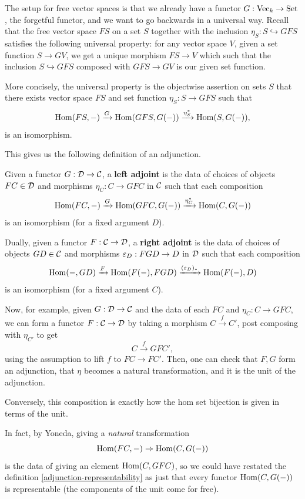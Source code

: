 \documentclass[12pt]{article}
\begin{document}
The setup for free vector spaces is that we already have a functor $G: \mathrm{Vec}_k \to \mathrm{Set}$, the forgetful functor, and we want to go backwards in a universal way. Recall that the free vector space $FS$ on a set $S$ together with the inclusion $\eta_S: S\hookrightarrow GFS$ satisfies the following universal property: for any vector space $V$, given a set function $S\to GV$, we get a unique morphism $FS\to V$ which such that the inclusion $S\hookrightarrow GFS$ composed with $GFS\to GV$ is our given set function.

More concisely, the universal property is the objectwise assertion on sets $S$ that there exists vector space $FS$ and set function $\eta_S: S\to GFS$ such that
\[\mathrm{Hom}(FS,-) \xrightarrow{G} \mathrm{Hom}(GFS,G(-)) \xrightarrow{\eta_S^*} \mathrm{Hom}(S,G(-)),\]
is an isomorphism.

This gives us the following definition of an adjunction.

\begin{defn} \label{adjunction-representability}
    Given a functor $G: \mathcal{D}\to \mathcal{C}$, a \textbf{left adjoint} is the data of choices of objects $FC \in \mathcal{D}$ and morphisms $\eta_C: C \to GFC$ in $\mathcal{C}$ such that each composition
    \[\mathrm{Hom}(FC,-) \xrightarrow{G} \mathrm{Hom}(GFC,G(-)) \xrightarrow{\eta_C^*} \mathrm{Hom}(C,G(-))\]
    is an isomorphism (for a fixed argument $D$).

    Dually, given a functor $F:\mathcal{C}\to \mathcal{D}$, a \textbf{right adjoint} is the data of choices of objects $GD \in \mathcal{C}$ and morphisms $\varepsilon_D: FGD \to D$ in $\mathcal{D}$ such that each composition
    \[\mathrm{Hom}(-,GD) \xrightarrow{F} \mathrm{Hom}(F(-),FGD) \xrightarrow{(\varepsilon_D)_*} \mathrm{Hom}(F(-),D)\]
    is an isomorphism (for a fixed argument $C$).
\end{defn}

Now, for example, given $G:\mathcal{D}\to \mathcal{C}$ and the data of each $FC$ and $\eta_C: C\to GFC$, we can form a functor $F: \mathcal{C}\to \mathcal{D}$ by taking a morphism $C\xrightarrow{f} C'$, post composing with $\eta_{C'}$ to get
\[C\xrightarrow{f} GFC',\]
using the assumption to lift $f$ to $FC\to FC'$. Then, one can check that $F,G$ form an adjunction, that $\eta$ becomes a natural transformation, and it is the unit of the adjunction.

Conversely, this composition is exactly how the hom set bijection is given in terms of the unit.

\begin{rmk}
    In fact, by Yoneda, giving a \textit{natural} transformation
    \[\mathrm{Hom}(FC,-) \Rightarrow \mathrm{Hom}(C,G(-))\]
    is the data of giving an element $\mathrm{Hom}(C,GFC)$, so we could have restated the definition \ref{adjunction-representability} as just that every functor $\mathrm{Hom}(C,G(-))$ is representable (the components of the unit come for free).
\end{rmk}
\end{document}
